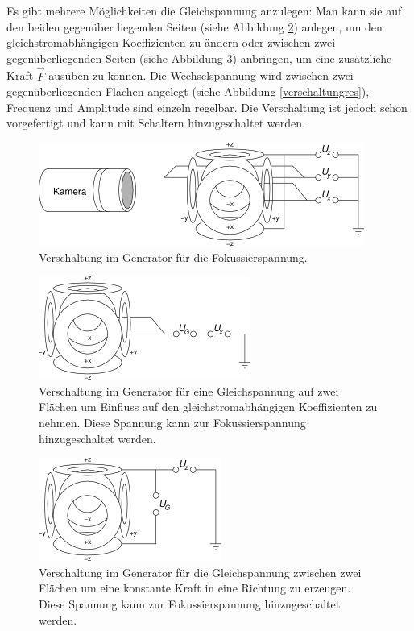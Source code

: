 \documentclass[a4paper,12pt]{article}
\begin{document}
Es gibt mehrere Möglichkeiten die Gleichspannung anzulegen:
Man kann sie auf den beiden gegenüber liegenden Seiten (siehe Abbildung \ref{verschaltungstab}) anlegen, um den gleichstromabhängigen Koeffizienten zu ändern
oder zwischen zwei gegenüberliegenden Seiten (siehe Abbildung \ref{verschaltungz}) anbringen, um eine zusätzliche Kraft $\vec{F}$ ausüben zu können.
Die Wechselspannung wird zwischen zwei gegenüberliegenden Flächen angelegt (siehe Abbildung \ref{verschaltungres}), Frequenz und Amplitude sind einzeln regelbar.
Die Verschaltung ist jedoch schon vorgefertigt und kann mit Schaltern hinzugeschaltet werden.

\begin{figure}[htb]
		\centering
		\includegraphics{Schaltbild_3Phasen.png}
		\caption{Verschaltung im Generator für die Fokussierspannung.\cite{versuchsanleitung}}
		\label{verschaltung3phase}
\end{figure}

\begin{figure}[htb]
		\centering
		\includegraphics{Schaltbild_Stabilitaet.png}
		\caption{Verschaltung im Generator für eine Gleichspannung auf zwei Flächen um Einfluss auf den gleichstromabhängigen Koeffizienten zu nehmen.
			Diese Spannung kann zur Fokussierspannung hinzugeschaltet werden.\cite{versuchsanleitung}
		}
		\label{verschaltungstab}
\end{figure}

\begin{figure}[htb]
		\centering
		\includegraphics{Schaltbild_Z_Kompensation.png}
		\caption{Verschaltung im Generator für die Gleichspannung zwischen zwei Flächen um eine konstante Kraft in eine Richtung zu erzeugen.
			Diese Spannung kann zur Fokussierspannung hinzugeschaltet werden.\cite{versuchsanleitung}
		}
		\label{verschaltungz}
\end{figure}
\end{document}
